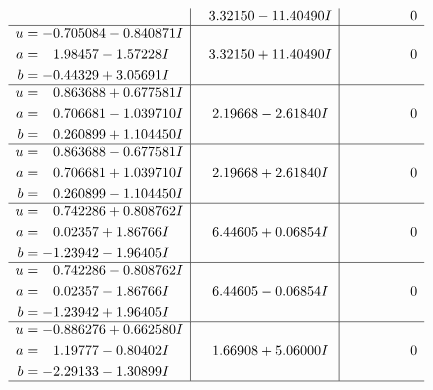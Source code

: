 \documentclass[1p]{elsarticle_modified}
\theoremstyle{definition}
\begin{document}
$$\begin{array}{c|c|c}
 & \phantom{-}3.32150 - 11.40490 I & \phantom{-0.000000 } 0 \\ \hline\begin{aligned}
u &= -0.705084 - 0.840871 I \\
a &= \phantom{-}1.98457 - 1.57228 I \\
b &= -0.44329 + 3.05691 I\end{aligned}
 & \phantom{-}3.32150 + 11.40490 I & \phantom{-0.000000 } 0 \\ \hline\begin{aligned}
u &= \phantom{-}0.863688 + 0.677581 I \\
a &= \phantom{-}0.706681 - 1.039710 I \\
b &= \phantom{-}0.260899 + 1.104450 I\end{aligned}
 & \phantom{-}2.19668 - 2.61840 I & \phantom{-0.000000 } 0 \\ \hline\begin{aligned}
u &= \phantom{-}0.863688 - 0.677581 I \\
a &= \phantom{-}0.706681 + 1.039710 I \\
b &= \phantom{-}0.260899 - 1.104450 I\end{aligned}
 & \phantom{-}2.19668 + 2.61840 I & \phantom{-0.000000 } 0 \\ \hline\begin{aligned}
u &= \phantom{-}0.742286 + 0.808762 I \\
a &= \phantom{-}0.02357 + 1.86766 I \\
b &= -1.23942 - 1.96405 I\end{aligned}
 & \phantom{-}6.44605 + 0.06854 I & \phantom{-0.000000 } 0 \\ \hline\begin{aligned}
u &= \phantom{-}0.742286 - 0.808762 I \\
a &= \phantom{-}0.02357 - 1.86766 I \\
b &= -1.23942 + 1.96405 I\end{aligned}
 & \phantom{-}6.44605 - 0.06854 I & \phantom{-0.000000 } 0 \\ \hline\begin{aligned}
u &= -0.886276 + 0.662580 I \\
a &= \phantom{-}1.19777 - 0.80402 I \\
b &= -2.29133 - 1.30899 I\end{aligned}
 & \phantom{-}1.66908 + 5.06000 I & \phantom{-0.000000 } 0\\
 \hline 
 \end{array}$$\newpage$$\begin{array}{c|c|c}  

\end{array}$$
\end{document}
